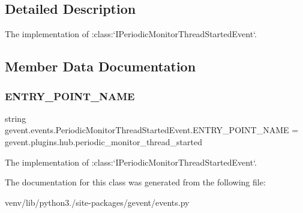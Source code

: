 \subsection{Detailed Description}
\begin{DoxyVerb}The implementation of :class:`IPeriodicMonitorThreadStartedEvent`.
\end{DoxyVerb}
 

\subsection{Member Data Documentation}
\mbox{\label{classgevent_1_1events_1_1_periodic_monitor_thread_started_event_a23eb56f4f3971442d5a8b5c1b24a85de}} 
\subsubsection{\texorpdfstring{E\+N\+T\+R\+Y\+\_\+\+P\+O\+I\+N\+T\+\_\+\+N\+A\+ME}{ENTRY\_POINT\_NAME}}
{\footnotesize\ttfamily string gevent.\+events.\+Periodic\+Monitor\+Thread\+Started\+Event.\+E\+N\+T\+R\+Y\+\_\+\+P\+O\+I\+N\+T\+\_\+\+N\+A\+ME = \textquotesingle{}gevent.\+plugins.\+hub.\+periodic\+\_\+monitor\+\_\+thread\+\_\+started\textquotesingle{}\hspace{0.3cm}{\ttfamily [static]}}

\begin{DoxyVerb}The implementation of :class:`IPeriodicMonitorThreadStartedEvent`.
\end{DoxyVerb}
 

The documentation for this class was generated from the following file\+:\begin{DoxyCompactItemize}
\item 
venv/lib/python3./site-\/packages/gevent/events.\+py\end{DoxyCompactItemize}
